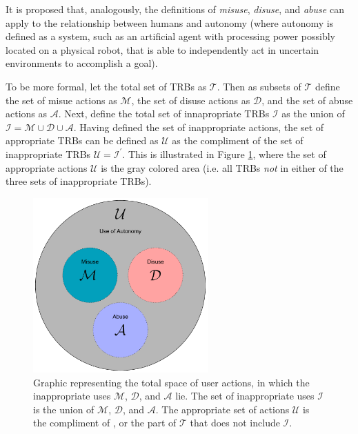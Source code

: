     It is proposed that, analogously, the definitions of \emph{misuse}, \emph{disuse}, and \emph{abuse} can apply to the relationship between humans and autonomy (where autonomy is defined as a system, such as an artificial agent with processing power possibly located on a physical robot, that is able to independently act in uncertain environments to accomplish a goal).
    
    To be more formal, let the total set of TRBs as $\mathcal{T}$. Then as subsets of $\mathcal{T}$ define the set of misue actions as $\mathcal{M}$, the set of disuse actions as $\mathcal{D}$, and the set of abuse actions as $\mathcal{A}$. Next, define the total set of innapropriate TRBs $\mathcal{I}$ as the union of $\mathcal{I} = \mathcal{M}\cup \mathcal{D}\cup\mathcal{A}$. Having defined the set of inappropriate actions, the set of appropriate TRBs can be defined as $\mathcal{U}$ as the compliment of the set of inappropriate TRBs $\mathcal{U} = \mathcal{I}^\prime$. This is illustrated in Figure \ref{fig:appropriate_use}, where the set of appropriate actions $\mathcal{U}$ is the gray colored area (i.e. all TRBs \emph{not} in either of the three sets of inappropriate TRBs).
    
	\begin{figure}[htbp]
    	\centering
     	\includegraphics[width=0.6\textwidth]{Figures/misuse_disuse_abuse}
    	\caption{Graphic representing the total space of user actions, in which the inappropriate uses $\mathcal{M}$, $\mathcal{D}$, and $\mathcal{A}$ lie. The set of inappropriate uses $\mathcal{I}$ is the union of $\mathcal{M}$, $\mathcal{D}$, and $\mathcal{A}$. The appropriate set of actions $\mathcal{U}$ is the compliment of , or the part of $\mathcal{T}$ that does not include $\mathcal{I}$.}
        \label{fig:appropriate_use}
    \end{figure}
    
